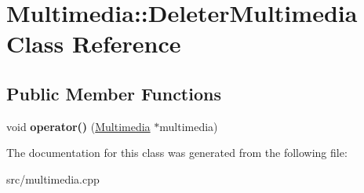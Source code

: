 \hypertarget{class_multimedia_1_1_deleter_multimedia}{\section{Multimedia\-:\-:Deleter\-Multimedia Class Reference}
\label{class_multimedia_1_1_deleter_multimedia}
}
\subsection*{Public Member Functions}
\begin{DoxyCompactItemize}
\item 
\hypertarget{class_multimedia_1_1_deleter_multimedia_ae95304647fc29be8b86c49775c43fdea}{void {\bfseries operator()} (\hyperlink{class_multimedia}{Multimedia} $\ast$multimedia)}\label{class_multimedia_1_1_deleter_multimedia_ae95304647fc29be8b86c49775c43fdea}

\end{DoxyCompactItemize}


The documentation for this class was generated from the following file\-:\begin{DoxyCompactItemize}
\item 
src/multimedia.\-cpp\end{DoxyCompactItemize}
